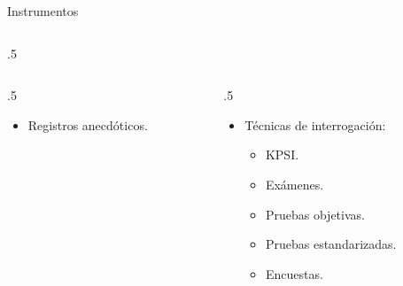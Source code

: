 \documentclass[11pt, aspectratio=169, xcolor=table,hyphens]{beamer}
\begin{document}
\begin{frame}{Instrumentos \cite{CASTILLO2010}}
\begin{columns}
\begin{column}{.5\linewidth}
{\begin{columns}
\begin{column}{.5\linewidth}
\begin{itemize}
\begin{itemize}
								      \item Registros anecdóticos.
							      \end{itemize}
						\end{itemize}
					\end{column}
					\begin{column}{.5\linewidth}
						\begin{itemize}
							\item Técnicas de interrogación:
							      \begin{itemize}
								      \item KPSI.
								      \item Exámenes.
								      \item Pruebas objetivas.
								      \item Pruebas estandarizadas.
								      \item Encuestas.
							      \end{itemize}
						\end{itemize}
					\end{column}
				\end{columns}
			}
		\end{column}
	\end{columns}
\end{frame}
\end{document}
